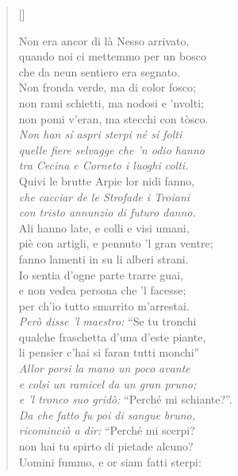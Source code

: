 \documentclass{article}
\begin{document}
\begin{verse}[\versewidth]
  \begin{patverse*}
    Non era ancor di là Nesso arrivato,\\
    quando noi ci mettemmo per un bosco\\
    che da neun sentiero era segnato.\\
    Non fronda verde, ma di color fosco;\\
    non rami schietti, ma nodosi e 'nvolti;\\
    non pomi v'eran, ma stecchi con tòsco.\\
    \emph{Non han sí aspri sterpi né sí folti \\
    quelle fiere selvagge che 'n odio hanno\\
    tra Cecina e Corneto i luoghi colti.}\\
    Quivi le brutte Arpie lor nidi fanno,\\
    \emph{che cacciar de le Strofade i Troiani\\
    con tristo annunzio di futuro danno.}\\
    Ali hanno late, e colli e visi umani,\\
    piè con artigli, e pennuto 'l gran ventre;\\
    fanno lamenti in su li alberi strani.\\
    Io sentia d'ogne parte trarre guai,\\
    e non vedea persona che 'l facesse;\\
    per ch'io tutto smarrito m'arrestai. \\
    \emph{Però disse 'l maestro:} ``Se tu tronchi\\
    qualche fraschetta d'una d'este piante,\\
    li pensier c'hai si faran tutti monchi''\\
    \emph{Allor porsi la mano un poco avante\\
    e colsi un ramicel da un gran pruno;\\
    e 'l tronco suo gridò:} ``Perché mi schiante?''.\\
    \emph{Da che fatto fu poi di sangue bruno,\\
    ricominciò a dir:} ``Perché mi scerpi?\\
    non hai tu spirto di pietade alcuno?\\
    Uomini fummo, e or siam fatti sterpi:\\

\end{patverse*}
\end{verse}
\end{document}
